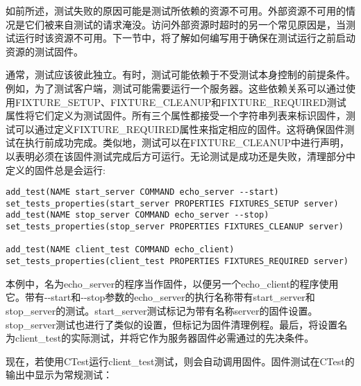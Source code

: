 如前所述，测试失败的原因可能是测试所依赖的资源不可用。外部资源不可用的情况是它们被来自测试的请求淹没。访问外部资源时超时的另一个常见原因是，当测试运行时该资源不可用。下一节中，将了解如何编写用于确保在测试运行之前启动资源的测试固件。


通常，测试应该彼此独立。有时，测试可能依赖于不受测试本身控制的前提条件。例如，为了测试客户端，测试可能需要运行一个服务器。这些依赖关系可以通过使用FIXTURE\_SETUP、FIXTURE\_CLEANUP和FIXTURE\_REQUIRED测试属性将它们定义为测试固件。所有三个属性都接受一个字符串列表来标识固件，测试可以通过定义FIXTURE\_REQUIRED属性来指定相应的固件。这将确保固件测试在执行前成功完成。类似地，测试可以在FIXTURE\_CLEANUP中进行声明，以表明必须在该固件测试完成后方可运行。无论测试是成功还是失败，清理部分中定义的固件总是会运行:

\begin{lstlisting}[style=styleCMake]
add_test(NAME start_server COMMAND echo_server --start)
set_tests_properties(start_server PROPERTIES FIXTURES_SETUP server)
add_test(NAME stop_server COMMAND echo_server --stop)
set_tests_properties(stop_server PROPERTIES FIXTURES_CLEANUP server)

add_test(NAME client_test COMMAND echo_client)
set_tests_properties(client_test PROPERTIES FIXTURES_REQUIRED server)
\end{lstlisting}

本例中，名为echo\_server的程序当作固件，以便另一个echo\_client的程序使用它。带有-{}-start和-{}-stop参数的echo\_server的执行名称带有start\_server和stop\_server的测试。start\_server测试标记为带有名称server的固件设置。stop\_server测试也进行了类似的设置，但标记为固件清理例程。最后，将设置名为client\_test的实际测试，并将它作为服务器固件必需通过的先决条件。

现在，若使用CTest运行client\_test测试，则会自动调用固件。固件测试在CTest的输出中显示为常规测试：


